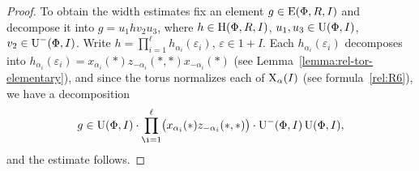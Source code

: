\begin{proof}
To obtain the width estimates fix an element $g\in\operatorname{E}(\Phi,R,I)$ and decompose it into $g=u_1 h v_2 u_3$, where $h\in\operatorname{H}(\Phi,R,I)$, $u_1,u_3\in\operatorname{U}(\Phi,I)$, $v_2\in\operatorname{U}^-(\Phi,I)$. Write $h=\prod_{i=1}^\ell h_{\alpha_i}(\varepsilon_i)$, $\varepsilon\in1+I$. Each $h_{\alpha_i}(\varepsilon_i)$ decomposes into $h_{\alpha_i}(\varepsilon_i) = x_{\alpha_i}(*) z_{-\alpha_i}(*,*) x_{-\alpha_i}(*)$ (see Lemma~\ref{lemma:rel-tor-elementary}), and since the torus normalizes each of $\operatorname{X}_\alpha(I)$ (see formula~\ref{rel:R6}), we have a decomposition
\[ g\in\U(\Phi,I)\cdot\prod_{\i=1}^\ell\bigl(x_{\alpha_i}(*)z_{-\alpha_i}(*,*)\bigr)\cdot \U^-(\Phi,I) \U(\Phi,I), \]
and the estimate follows.
%
%
\end{proof}

